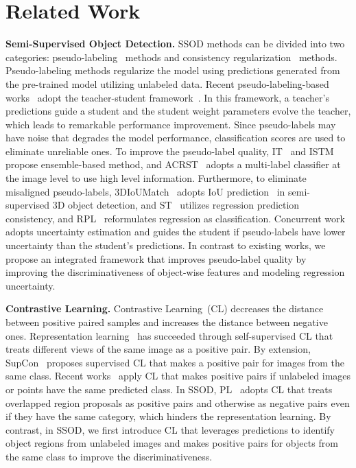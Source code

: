 \documentclass{bmvc2k}
\begin{document}
\section{Related Work}
\label{sec:related_work}
\noindent\textbf{Semi-Supervised Object Detection.}
SSOD methods can be divided into two categories: pseudo-labeling~\cite{STAC, wang2021data} methods and consistency regularization~\cite{NEURIPS2019_csd, ISD, proposal_learning} methods. Pseudo-labeling methods regularize the model using predictions generated from the pre-trained model utilizing unlabeled data.
Recent pseudo-labeling-based works~\cite{liu2021unbiased, instant_teaching, humbleteacher, yang2021interactive} adopt the teacher-student framework~\cite{meanteacher}. In this framework, a teacher's predictions guide a student and the student weight parameters evolve the teacher, which leads to remarkable performance improvement. Since pseudo-labels may have noise that degrades the model performance, classification scores are used to eliminate unreliable ones. To improve the pseudo-label quality, IT~\cite{instant_teaching} and ISTM~\cite{yang2021interactive} propose ensemble-based method, and ACRST~\cite{adaptiveclass} adopts a multi-label classifier at the image level to use high level information. Furthermore, to eliminate misaligned pseudo-labels, 3DIoUMatch~\cite{wang20213dioumatch} adopts IoU prediction~\cite{iounet} in semi-supervised 3D object detection, and ST~\cite{xu2021soft} utilizes regression prediction consistency, and RPL~\cite{rethink} reformulates regression as classification. Concurrent work~\cite{ubteacherv2} adopts uncertainty estimation and guides the student if pseudo-labels have lower uncertainty than the student's predictions. In contrast to existing works, we propose an integrated framework that improves pseudo-label quality by improving the discriminativeness of object-wise features and modeling regression uncertainty. 

\noindent\textbf{Contrastive Learning.}
Contrastive Learning~(CL) decreases the distance between positive paired samples and increases the distance between negative ones. Representation learning~\cite{mocov3, simclr, infonce} has succeeded through self-supervised CL that treats different views of the same image as a positive pair. By extension, SupCon~\cite{khosla2020supcont} proposes supervised CL that makes a positive pair for images from the same class. Recent works~\cite{class_aware, pointcontrasitve} apply CL that makes positive pairs if unlabeled images or points have the same predicted class. In SSOD, PL~\cite{proposal_learning} adopts CL that treats overlapped region proposals as positive pairs and otherwise as negative pairs even if they have the same category, which hinders the representation learning. By contrast, in SSOD, we first introduce CL that leverages predictions to identify object regions from unlabeled images and makes positive pairs for objects from the same class to improve the discriminativeness.
\end{document}
